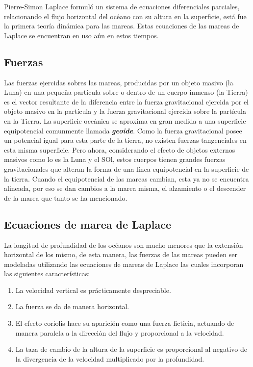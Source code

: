 \documentclass{article}
\begin{document}
Pierre-Simon Laplace formuló un sistema de ecuaciones diferenciales parciales, relacionando el flujo horizontal del océano con su altura en la superficie, está fue la primera teoría dinámica para las mareas. Estas ecuaciones de las mareas de Laplace se encuentran en uso aún en estos tiempos.\\

\subsection{Fuerzas}
Las fuerzas ejercidas sobres las mareas, producidas por un objeto masivo (la Luna) en una pequeña partícula sobre o dentro de un cuerpo inmenso (la Tierra) es el vector resultante de la diferencia entre la fuerza gravitacional ejercida por el objeto masivo en la partícula y la fuerza gravitacional ejercida sobre la partícula en la Tierra. La superficie oceánica se aproxima en gran medida a una superficie equipotencial comunmente llamada \textit{\textbf{geoide}}. Como la fuerza gravitacional posee un potencial igual para esta parte de la tierra, no existen fuerzas tangenciales en esta misma superficie. Pero ahora, considerando el efecto de objetos externos masivos como lo es la Luna y el SOl, estos cuerpos tienen grandes fuerzas gravitacionales que alteran la forma de una línea equipotencial en la superficie de la tierra. Cuando el equipotencial de las mareas cambian, esta ya no se encuentra alineada, por eso se dan cambios a la marea misma, el alzamiento o el descender de la marea que tanto se ha mencionado.\\

\subsection{Ecuaciones de marea de Laplace}
La longitud de profundidad de los océanos son mucho menores que la extensión horizontal de los mismo, de esta manera, las fuerzas de las mareas pueden ser modeladas utilizando las ecuaciones de mareas de Laplace las cuales incorporan las siguientes características:
\begin{enumerate}
\item La velocidad vertical es prácticamente despreciable.
\item La fuerza se da de manera horizontal.
\item El efecto coriolis hace su aparición como una fuerza ficticia, actuando de manera paralela a la dirección del flujo y proporcional a la velocidad.
\item La taza de cambio de la altura de la superficie es proporcional al negativo de la divergencia de la velocidad multiplicado por la profundidad.
\end{enumerate}
\end{document}
